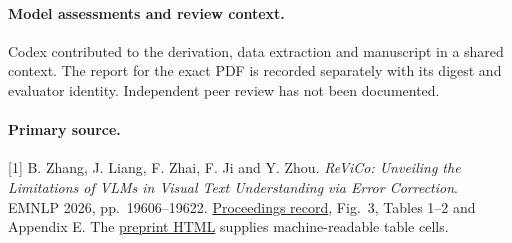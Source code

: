 \documentclass[11pt]{article}
\begin{document}
\paragraph{Model assessments and review context.}
Codex contributed to the derivation, data extraction and manuscript in a shared context. The report for the exact PDF is recorded separately with its digest and evaluator identity. Independent peer review has not been documented.
\paragraph{Primary source.}
[1] B. Zhang, J. Liang, F. Zhai, F. Ji and Y. Zhou. \emph{ReViCo: Unveiling the Limitations of VLMs in Visual Text Understanding via Error Correction}. EMNLP 2026, pp.\ 19606--19622. \href{https://aclanthology.org/2026.emnlp-main.845/}{Proceedings record}, Fig.\ 3, Tables 1--2 and Appendix E. The \href{https://arxiv.org/html/2608.27154v1}{preprint HTML} supplies machine-readable table cells.
\end{document}
